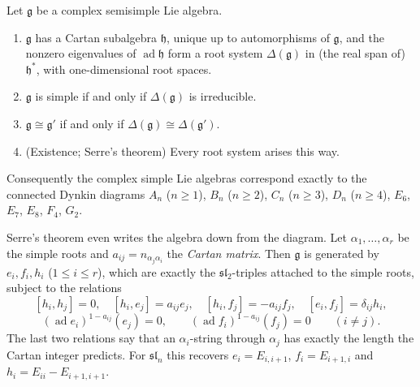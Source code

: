 \begin{theorem}\label{LIE:thm:KC}
Let $\mathfrak g$ be a complex semisimple Lie algebra.
\begin{enumerate}[nosep]
\item $\mathfrak g$ has a Cartan subalgebra $\mathfrak h$, unique up to automorphisms of $\mathfrak g$, and the
  nonzero eigenvalues of $\operatorname{ad}\mathfrak h$ form a root system $\Delta(\mathfrak g)$ in (the real
  span of) $\mathfrak h^*$, with one-dimensional root spaces.
\item $\mathfrak g$ is simple if and only if $\Delta(\mathfrak g)$ is irreducible.
\item $\mathfrak g\cong\mathfrak g'$ if and only if $\Delta(\mathfrak g)\cong\Delta(\mathfrak g')$.
\item (Existence; Serre's theorem) Every root system arises this way.
\end{enumerate}
Consequently the complex simple Lie algebras correspond exactly to the connected Dynkin diagrams
$A_n$ ($n\ge1$), $B_n$ ($n\ge2$), $C_n$ ($n\ge3$), $D_n$ ($n\ge4$), $E_6$, $E_7$, $E_8$, $F_4$, $G_2$.
\end{theorem}

Serre's theorem even writes the algebra down from the diagram. Let $\alpha_1,\dots,\alpha_r$ be the
simple roots and $a_{ij}=n_{\alpha_j\alpha_i}$ the \emph{Cartan matrix}. Then $\mathfrak g$ is generated by
$e_i,f_i,h_i$ ($1\le i\le r$), which are exactly the $\mathfrak{sl}_2$-triples attached to the simple
roots, subject to the relations
\[
  [h_i,h_j]=0,\quad [h_i,e_j]=a_{ij}e_j,\quad [h_i,f_j]=-a_{ij}f_j,\quad [e_i,f_j]=\delta_{ij}h_i,
\]
\[
  (\operatorname{ad}e_i)^{1-a_{ij}}(e_j)=0,\qquad (\operatorname{ad}f_i)^{1-a_{ij}}(f_j)=0\qquad(i\neq j).
\]
The last two relations say that an $\alpha_i$-string through $\alpha_j$ has exactly the length the
Cartan integer predicts. For $\mathfrak{sl}_n$ this recovers $e_i=E_{i,i+1}$, $f_i=E_{i+1,i}$ and
$h_i=E_{ii}-E_{i+1,i+1}$.


